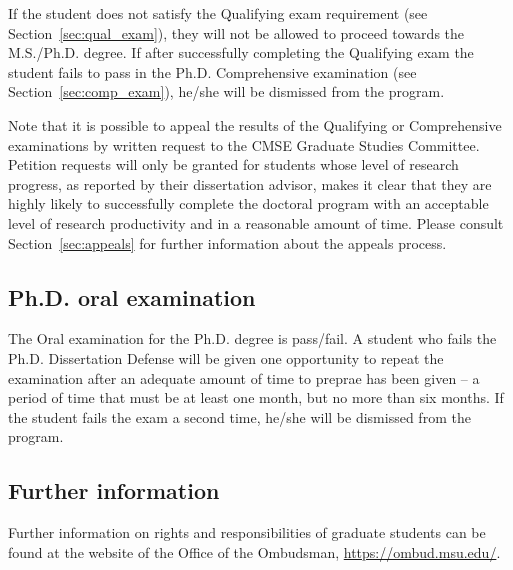 If the student does not satisfy the Qualifying exam requirement (see
Section~\ref{sec:qual_exam}), they will not be allowed to proceed
towards the M.S./Ph.D. degree.  If after successfully completing the
Qualifying exam the student fails to pass in the Ph.D. Comprehensive
examination (see Section~\ref{sec:comp_exam}), he/she will be
dismissed from the program.  

Note that it is possible to appeal the results of the Qualifying or
Comprehensive examinations by written request to the CMSE Graduate
Studies Committee. Petition requests will only be granted for students
whose level of research progress, as reported by their dissertation
advisor, makes it clear that they are highly likely to successfully
complete the doctoral program with an acceptable level of research
productivity and in a reasonable amount of time.  Please consult
Section~\ref{sec:appeals} for further information about the appeals
process.

\subsection{Ph.D. oral examination}

The Oral examination for the Ph.D. degree is pass/fail.  A student who fails the Ph.D. Dissertation Defense will be given one
opportunity to repeat the examination after an
adequate amount of time to preprae has been given -- a period of time
that must be at least one month, but no more than six months.  If the student fails the exam a second
time, he/she will be dismissed from the program.

\subsection{Further information}

Further information on rights and responsibilities of graduate
students can be found at the website of the Office of the Ombudsman,
\url{https://ombud.msu.edu/}.

 
